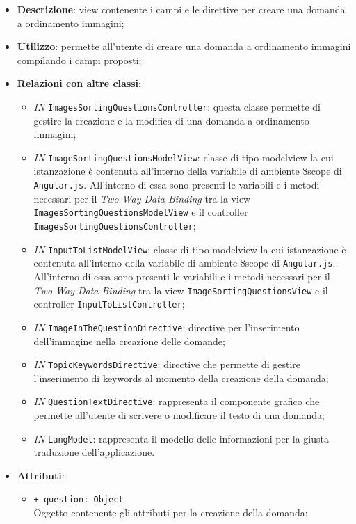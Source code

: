 \begin{itemize}
	\item \textbf{Descrizione}: view contenente i campi e le direttive per creare una domanda a ordinamento immagini;
	\item \textbf{Utilizzo}: permette all'utente di creare una domanda a ordinamento immagini compilando i campi proposti;
	\item \textbf{Relazioni con altre classi}:
	\begin{itemize}
		\item \textit{IN} \texttt{ImagesSortingQuestionsController}: questa classe permette di gestire la creazione e la modifica di una domanda a ordinamento immagini;
		\item \textit{IN} \texttt{ImageSortingQuestionsModelView}: classe di tipo modelview la cui istanzazione è contenuta all'interno della variabile di ambiente \$scope di \texttt{Angular.js}. All'interno di essa sono presenti le variabili e i metodi necessari per il \textit{Two-Way Data-Binding} tra la view \texttt{ImagesSortingQuestionsModelView} e il controller \texttt{ImagesSortingQuestionsController};
		\item \textit{IN} \texttt{InputToListModelView}: classe di tipo modelview la cui istanzazione è contenuta all'interno della variabile di ambiente \$scope di \texttt{Angular.js}. All'interno di essa sono presenti le variabili e i metodi necessari per il \textit{Two-Way Data-Binding} tra la view \texttt{ImageSortingQuestionsView} e il controller \texttt{InputToListController};
		\item \textit{IN} \texttt{ImageInTheQuestionDirective}: directive per l'inserimento dell'immagine nella creazione delle domande;
		\item \textit{IN} \texttt{TopicKeywordsDirective}: directive che permette di gestire l'inserimento di keywords al momento della creazione della domanda;
		\item \textit{IN} \texttt{QuestionTextDirective}: rappresenta il componente grafico che permette all'utente di scrivere o modificare il testo di una domanda;
		\item \textit{IN} \texttt{LangModel}: rappresenta il modello delle informazioni per la giusta traduzione dell'applicazione.
	\end{itemize}
	\item \textbf{Attributi}:
	\begin{itemize}
			\item \texttt{+ question: Object} \\ Oggetto contenente gli attributi per la creazione della domanda:

\end{itemize}
\end{itemize}
